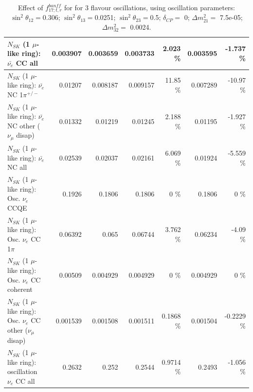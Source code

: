 \begin{table}
\begin{tabular}{| l | r | r | r  r | r  r |}
                            $N_{SK}$ (1 $\mu$-like ring): $\bar{\nu_{e}}$ CC all &        0.003907 &        0.003659 &        0.003733 &    2.023 \%  &        0.003595 &   -1.737 \%  \\ 
\hline
                     $N_{SK}$ (1 $\mu$-like ring): $\bar{\nu_e}$ NC 1$\pi^{+/-}$ &         0.01207 &        0.008187 &        0.009157 &    11.85 \%  &        0.007289 &   -10.97 \%  \\ 
          $N_{SK}$ (1 $\mu$-like ring): $\bar{\nu_e}$ NC other ($\nu_\mu$ disap) &         0.01332 &         0.01219 &         0.01245 &    2.188 \%  &         0.01195 &   -1.927 \%  \\ 
                            $N_{SK}$ (1 $\mu$-like ring): $\bar{\nu_{e}}$ NC all &         0.02539 &         0.02037 &         0.02161 &    6.069 \%  &         0.01924 &   -5.559 \%  \\ 
\hline
\hline
\hline
                                 $N_{SK}$ (1 $\mu$-like ring): Osc. $\nu_e$ CCQE &          0.1926 &          0.1806 &          0.1806 &        0 \%  &          0.1806 &        0 \%  \\ 
                            $N_{SK}$ (1 $\mu$-like ring): Osc. $\nu_e$ CC 1$\pi$ &         0.06392 &           0.065 &         0.06744 &    3.762 \%  &         0.06234 &    -4.09 \%  \\ 
                          $N_{SK}$ (1 $\mu$-like ring): Osc. $\nu_e$ CC coherent &         0.00509 &        0.004929 &        0.004929 &        0 \%  &        0.004929 &        0 \%  \\ 
           $N_{SK}$ (1 $\mu$-like ring): Osc. $\nu_e$ CC other ($\nu_\mu$ disap) &        0.001539 &        0.001508 &        0.001511 &   0.1868 \%  &        0.001504 &  -0.2229 \%  \\ 
                        $N_{SK}$ (1 $\mu$-like ring): oscillation $\nu_e$ CC all &          0.2632 &           0.252 &          0.2544 &   0.9714 \%  &          0.2493 &   -1.056 \%  \\ 
\hline
\hline
\end{tabular}
\caption{ Effect of $f_{17; t, r}^{banff}$ for for 3 flavour oscillations, using oscillation parameters:  $\sin^2\theta_{12} = $0.306; $\sin^2\theta_{13} = $0.0251; $\sin^2\theta_{23} = $0.5; $\delta_{CP} = $        0; $\Delta m^2_{21} = $    7.5e-05; $\Delta m^2_{32} = $    0.0024. }
\label{tab:num_banff_mares_1RmuT_3f_osc_t13:0.0251}
\end{table}
\clearpage
